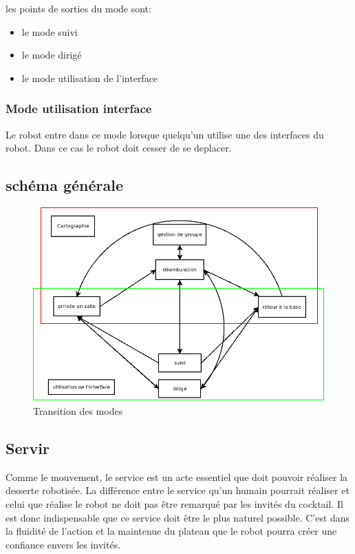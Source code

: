 les points de sorties du mode sont:
\begin{itemize}
\item le mode suivi
\item le mode dirigé
\item le mode utilisation de l'interface\\
\end{itemize}

\subsubsection{Mode utilisation interface}
Le robot entre dans ce mode lorsque quelqu'un utilise une des
interfaces du robot. Dans ce cas le robot doit cesser de se deplacer.

\subsection{schéma générale}

\begin{figure}[h]
\begin{center}
\includegraphics[scale=0.55]{Images/transition_mode.png}
\caption{Transition des modes}
\label{Transition des modes}
\end{center}
\end{figure}

\subsection{Servir}

Comme le mouvement, le service est un acte essentiel que doit pouvoir réaliser la desserte robotisée.
 La différence entre le service qu’un humain pourrait réaliser et celui que réalise le robot ne doit
 pas être remarqué par les invités du cocktail. Il est donc indispensable que ce service doit être le
 plus naturel possible. C’est dans la fluidité de l’action et la maintenue du plateau que le robot 
pourra créer une confiance envers les invités.

